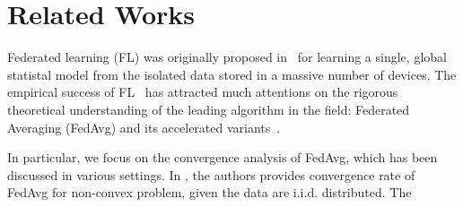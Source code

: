 
\section{Related Works}

Federated learning (FL) was originally proposed
in~\cite{mcmahan2016communication} for learning a single, global statistal
model from the isolated data stored in a massive number of devices.  The
empirical success of FL~\cite{chen2018federated,47586} has attracted much
attentions on the rigorous theoretical understanding of the leading algorithm 
in the field: Federated Averaging (FedAvg) and its accelerated variants~\cite{liu2019accelerating,haddadpour2019convergence,khaled2019first,li2019convergence,huo2020faster,yu2019linear,yu2019parallel,koloskova2020unified}.

In particular, we focus on the convergence analysis of FedAvg, which
has been discussed in various settings. 
In \cite{yu2019parallel,wang2019adaptive}, the authors provides convergence
rate of FedAvg for non-convex problem, given the data are i.i.d. distributed.
The 






